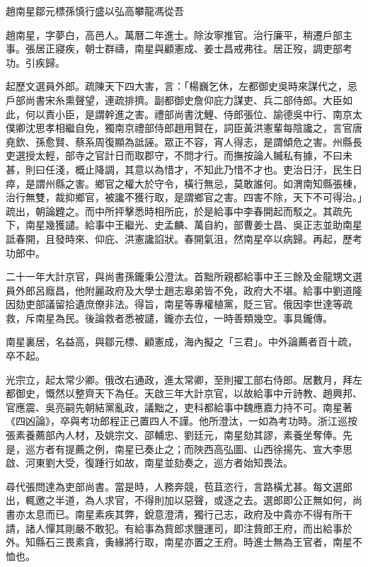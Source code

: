 
\begin{pinyinscope}
趙南星鄒元標孫慎行盛以弘高攀龍馮從吾

趙南星，字夢白，高邑人。萬曆二年進士。除汝寧推官。治行廉平，稍遷戶部主事。張居正寢疾，朝士群禱，南星與顧憲成、姜士昌戒弗往。居正歿，調吏部考功。引疾歸。

起歷文選員外郎。疏陳天下四大害，言：「楊巍乞休，左都御史吳時來謀代之，忌戶部尚書宋糸熏聲望，連疏排擠。副都御史詹仰庇力謀吏、兵二部侍郎。大臣如此，何以責小臣，是謂幹進之害。禮部尚書沈鯉、侍郎張位、諭德吳中行、南京太僕卿沈思孝相繼自免，獨南京禮部侍郎趙用賢在，詞臣黃洪憲輩每陰讒之，言官唐堯欽、孫愈賢、蔡系周復顯為詆誣。眾正不容，宵人得志，是謂傾危之害。州縣長吏選授太輕，部寺之官計日而取郡守，不問才行。而撫按論人贓私有據，不曰未甚，則曰任淺，概止降調，其意以為惜才，不知此乃惜不才也。吏治日汙，民生日瘁，是謂州縣之害。鄉官之權大於守令，橫行無忌，莫敢誰何。如渭南知縣張棟，治行無雙，裁抑鄉官，被讒不獲行取，是謂鄉官之害。四害不除，天下不可得治。」疏出，朝論韙之。而中所抨擊悉時相所庇，於是給事中李春開起而駁之。其疏先下，南星幾獲譴。給事中王繼光、史孟麟、萬自約，部曹姜士昌、吳正志並助南星詆春開，且發時來、仰庇、洪憲讒諂狀。春開氣沮，然南星卒以病歸。再起，歷考功郎中。

二十一年大計京官，與尚書孫鑨秉公澄汰。首黜所親都給事中王三餘及金龍甥文選員外郎呂廕昌，他附麗政府及大學士趙志皋弟皆不免，政府大不堪。給事中劉道隆因劾吏部議留拾遺庶僚非法。得旨，南星等專權植黨，貶三官。俄因李世達等疏救，斥南星為民。後論救者悉被譴，鑨亦去位，一時善類幾空。事具鑨傳。

南星裏居，名益高，與鄒元標、顧憲成，海內擬之「三君」。中外論薦者百十疏，卒不起。

光宗立，起太常少卿。俄改右通政，進太常卿，至則擢工部右侍郎。居數月，拜左都御史，慨然以整齊天下為任。天啟三年大計京官，以故給事中亓詩教、趙興邦、官應震、吳亮嗣先朝結黨亂政，議黜之，吏科都給事中魏應嘉力持不可。南星著《四凶論》，卒與考功郎程正己置四人不謹。他所澄汰，一如為考功時。浙江巡按張素養薦部內人材，及姚宗文、邵輔忠、劉廷元，南星劾其謬，素養坐奪俸。先是，巡方者有提薦之例，南星已奏止之；而陜西高弘圖、山西徐揚先、宣大李思啟、河東劉大受，復踵行如故，南星並劾奏之，巡方者始知畏法。

尋代張問達為吏部尚書。當是時，人務奔競，苞苴恣行，言路橫尤甚。每文選郎出，輒邀之半道，為人求官，不得則加以惡聲，或逐之去。選郎即公正無如何，尚書亦太息而已。南星素疾其弊，銳意澄清，獨行己志，政府及中貴亦不得有所干請，諸人憚其剛嚴不敢犯。有給事為貲郎求鹽運司，即注貲郎王府，而出給事於外。知縣石三畏素貪，夤緣將行取，南星亦置之王府。時進士無為王官者，南星不恤也。


\end{pinyinscope}
